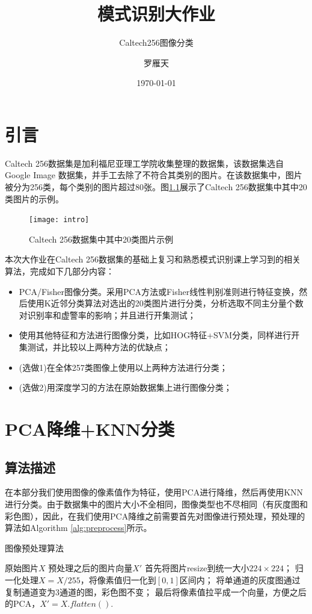 \documentclass[cn]{elegantbook}
\title{模式识别大作业}
\subtitle{Caltech256图像分类}
\author{罗雁天}
\institute{清华大学电子系}
\date{\today}
\begin{document}
\maketitle
\tableofcontents
\mainmatter
\hypersetup{pageanchor=true}
\chapter{引言}
Caltech 256数据集是加利福尼亚理工学院收集整理的数据集，该数据集选自Google Image 数据集，并手工去除了不符合其类别的图片。在该数据集中，图片被分为256类，每个类别的图片超过80张。图\ref{intro}展示了Caltech 256数据集中其中20类图片的示例。

\begin{figure}[!h]
	\centering
	\texttt{[image: intro]}
	\caption{\label{intro}Caltech 256数据集中其中20类图片示例}
\end{figure}

本次大作业在Caltech 256数据集的基础上复习和熟悉模式识别课上学习到的相关算法，完成如下几部分内容：
\begin{itemize}
	\item PCA/Fisher图像分类。采用PCA方法或Fisher线性判别准则进行特征变换，然后使用K近邻分类算法对选出的20类图片进行分类，分析选取不同主分量个数对识别率和虚警率的影响；并且进行开集测试；
	\item 使用其他特征和方法进行图像分类，比如HOG特征+SVM分类，同样进行开集测试，并比较以上两种方法的优缺点；
	\item (选做1)在全体257类图像上使用以上两种方法进行分类；
	\item (选做2)用深度学习的方法在原始数据集上进行图像分类；
\end{itemize}

\chapter{PCA降维+KNN分类}
\section{算法描述}
在本部分我们使用图像的像素值作为特征，使用PCA进行降维，然后再使用KNN进行分类。由于数据集中的图片大小不全相同，图像类型也不尽相同（有灰度图和彩色图），因此，在我们使用PCA降维之前需要首先对图像进行预处理，预处理的算法如Algorithm \ref{alg:preprocess}所示。

\begin{algorithm}[htb]
	\caption{图像预处理算法}
	\label{alg:preprocess}
	\begin{algorithmic}[1]
		\Require 原始图片$X$
		\Ensure 预处理之后的图片向量$X'$
		\State 首先将图片resize到统一大小$224\times 224$；
		\State 归一化处理$X = X / 255$，将像素值归一化到$[0,1]$区间内；
		\State 将单通道的灰度图通过复制通道变为3通道的图，彩色图不变；
		\State 最后将像素值拉平成一个向量，方便之后的PCA，$X'=X.flatten()$.
	\end{algorithmic}
\end{algorithm}
\end{document}
